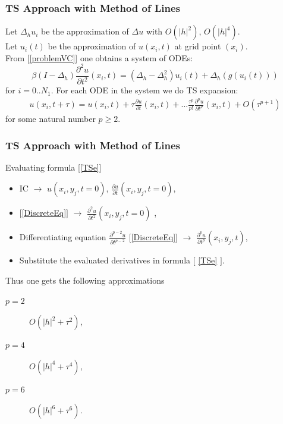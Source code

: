 \documentclass{beamer}
\newcommand{\be}{\begin{equation}}
\newcommand{\ee}{\end{equation}}
\begin{document}

\begin{frame}
\frametitle{TS Approach with Method of Lines}

Let $\Delta_h u_{i}$ be the approximation of $\Delta u$ with $O(|h|^2)$, $O(|h|^4)$.
\\
Let $u_{i}(t)$ be the approximation of $u(x_i, t)$ at grid point $(x_i)$.
\\
From [\ref{problemVC}] one obtains a system of ODEs:
\be \label{DiscreteEq}
\beta (I-\Delta_h) \frac{\partial^2 u}{\partial t^2}(x_i, t)=
 (\Delta_h - \Delta_h^2) u_{i}(t) + \Delta_h ( g( u_{i}(t) ) )
\ee
for $i = 0..N_1$. For each ODE in the system we do TS expansion:
\begin{align} \label{TSe}
u(x_i, t+\tau) = u(x_i, t) + \tau \frac{ \partial u }{ \partial t }(x_i, t)  + ... 
\frac{ \tau^p }{ p! } \frac{ \partial^p u }{ \partial t^p }(x_i, t) + O(\tau^{p+1})
\end{align}
for some natural number $p \ge 2$.
\end{frame}


\begin{frame}
\frametitle{TS Approach with Method of Lines}
Evaluating formula [\ref{TSe}]
\begin{itemize}
 \item IC $\rightarrow$ $u(x_i, y_j, t=0)$, $\frac{ \partial u }{ \partial t }(x_i, y_j, t=0)$,
 \item $[$\ref{DiscreteEq}$]$ $\rightarrow$ $\frac{ \partial^2 u }{ \partial t^2 }(x_i, y_j, t=0)$ ,
 \item Differentiating equation $\frac{ \partial^{p-2} u }{ \partial t^{p-2} }$ [\ref{DiscreteEq}] $\rightarrow$  $\frac{ \partial^p u }{ \partial t^p }(x_i, y_j, t)$,
 \item Substitute the evaluated derivatives in formula $[$ \ref{TSe} $]$.
\end{itemize}


Thus one gets the following approximations
\begin{description}
 \item[$p=2$] $O(|h|^2 + \tau^2)$,
 \item[$p=4$] $O(|h|^4 + \tau^4)$,
 \item[$p=6$] $O(|h|^6 + \tau^6)$.
\end{description}
\end{frame}
\end{document}
